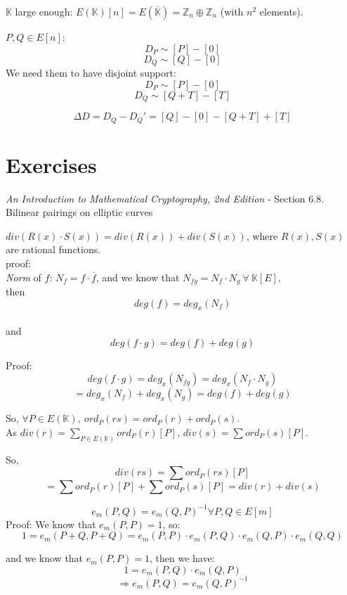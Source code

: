 \documentclass{article}
\theoremstyle{definition}
\newenvironment{solution}[1]
{\renewcommand\theinnersolution{#1}\innersolution}
{\endinnersolution}
\begin{document}
$\mathbb{K}$ large enough: $E(\mathbb{K})[n] = E(\mathbb{\overline{K}}) = \mathbb{Z}_n \oplus \mathbb{Z}_n$ (with $n^2$ elements).

$P, Q \in E[n]$:
$$D_P \sim [P] - [0]$$
$$D_Q \sim [Q] - [0]$$
We need them to have disjoint support:
$$D_P \sim [P] - [0]$$
$$D_Q \sim [Q+T] - [T]$$

$$\Delta D = D_Q - D_Q' = [Q] - [0] - [Q+T] + [T]$$


\section{Exercises}
\emph{An Introduction to Mathematical Cryptography, 2nd Edition} - Section 6.8. Bilinear pairings on elliptic curves

\begin{solution}{6.29}
  $div(R(x) \cdot S(x)) = div( R(x)) + div( S(x))$, where $R(x), S(x)$ are rational functions.
  \\proof:\\
  \emph{Norm} of $f$: $N_f = f \cdot \overline{f}$, and we know that $N_{fg} = N_f \cdot N_g~\forall~\mathbb{K}[E]$,\\
  then $$deg(f) = deg_x(N_f)$$\\
  and $$deg(f \cdot g) = deg(f) + deg(g)$$

  Proof:
  $$deg(f \cdot g) = deg_x(N_{fg}) = deg_x(N_f \cdot N_g)$$
  $$= deg_x(N_f) + deg_x(N_g) = deg(f) + deg(g)$$

  So, $\forall P \in E(\mathbb{K}),~ ord_P(rs) = ord_P(r) + ord_P(s)$.\\
  As $div(r) = \sum_{P\in E(\mathbb{K})} ord_P(r)[P]$, $div(s) = \sum ord_P(s)[P]$.

  So,
  $$div(rs) = \sum ord_P(rs)[P]$$
  $$= \sum ord_P(r)[P] + \sum ord_P(s)[P] = div(r) + div(s)$$
\end{solution}

\vspace{0.5cm}

\begin{solution}{6.31}
  $$e_m(P, Q) = e_m(Q, P)^{-1} \forall P, Q \in E[m]$$
  Proof:
  We know that $e_m(P, P) = 1$, so:
  $$1 = e_m(P+Q, P+Q) = e_m(P, P) \cdot e_m(P, Q) \cdot e_m(Q, P) \cdot e_m(Q, Q)$$

  and we know that $e_m(P, P) = 1$, then we have:
  $$1 = e_m(P, Q) \cdot e_m(Q, P)$$
  $$\Longrightarrow e_m(P, Q) = e_m(Q, P)^{-1}$$
\end{solution}
\end{document}
